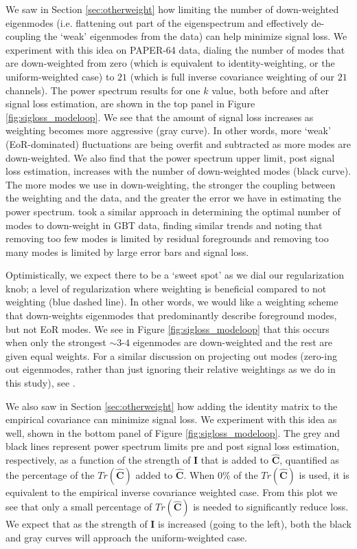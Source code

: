 \documentclass[preprint2,numberedappendix,tighten]{aastex6}  %
\begin{document}
We saw in Section \ref{sec:otherweight} how limiting the number of down-weighted eigenmodes (i.e. flattening out part of the 
eigenspectrum and effectively de-coupling the `weak' eigenmodes from the data) can help minimize signal loss. We experiment with this idea on PAPER-64 data, dialing the number of modes 
that are down-weighted from zero (which is equivalent to identity-weighting, or the uniform-weighted case) to $21$ (which is full inverse 
covariance weighting of our $21$ channels). The power spectrum results for one $k$ value, both before and after signal loss 
estimation, are shown in the top panel in Figure \ref{fig:sigloss_modeloop}. We see that the amount of signal loss increases as weighting 
becomes more aggressive (gray curve). In other words, more `weak' (EoR-dominated) fluctuations are being overfit and 
subtracted as more modes are down-weighted. We also find that the power spectrum upper limit, post signal loss estimation, 
increases with the number of down-weighted modes (black curve). The more modes we use in down-weighting, the stronger the coupling between the weighting and the data, and the greater the error we have in estimating the power spectrum. \citet{switzer_et_al2013} took a similar approach in determining the optimal number of modes to down-weight in GBT data, finding similar trends and noting that removing too few modes is limited by residual foregrounds and removing too many modes is limited by large error bars and signal loss.

Optimistically, we expect there to be a `sweet spot' as we dial our regularization knob; a level of regularization where weighting 
is beneficial compared to not weighting (blue dashed line). In other words, we would like a weighting scheme that down-weights eigenmodes that predominantly describe foreground modes, but not EoR modes. We see in Figure \ref{fig:sigloss_modeloop} that this occurs when 
only the strongest $\sim3$-$4$ eigenmodes are down-weighted and the rest are given equal weights. For a similar discussion on projecting out modes (zero-ing out eigenmodes, rather than just ignoring their relative weightings as we do in this study), see \citet{switzer_et_al2013}. 

We also saw in Section \ref{sec:otherweight} how adding the identity matrix to the empirical covariance can minimize signal loss. We experiment with this idea as well, shown in the bottom panel of Figure \ref{fig:sigloss_modeloop}. The grey and black lines represent power spectrum limits pre and post signal loss estimation, respectively, as a function of the strength of $\textbf{I}$ that is added to $\widehat{\textbf{C}}$, quantified as the percentage of the $Tr(\widehat{\textbf{C}})$ added to $\widehat{\textbf{C}}$. When $0\%$  of the $Tr(\widehat{\textbf{C}})$ is used, it is equivalent to the empirical inverse covariance weighted case. From this plot we see that only a small percentage of $Tr(\widehat{\textbf{C}})$ is needed to significantly reduce loss. We expect that as the strength of $\textbf{I}$ is increased (going to the left), both the black and gray curves will approach the uniform-weighted case.
\end{document}
